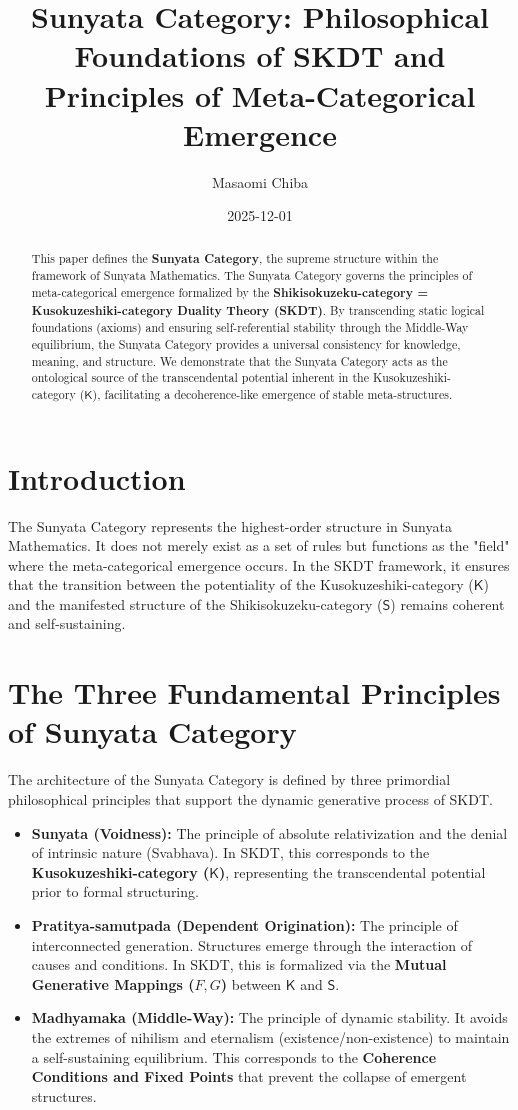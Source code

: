 \documentclass[12pt,a4paper]{article}
\title{Sunyata Category: Philosophical Foundations of SKDT and Principles of Meta-Categorical Emergence}
\author{Masaomi Chiba}
\date{2025-12-01}
\begin{document}
\maketitle

\begin{abstract}
This paper defines the \textbf{Sunyata Category}, the supreme structure within the framework of Sunyata Mathematics. The Sunyata Category governs the principles of meta-categorical emergence formalized by the \textbf{Shikisokuzeku-category = Kusokuzeshiki-category Duality Theory (SKDT)}. By transcending static logical foundations (axioms) and ensuring self-referential stability through the Middle-Way equilibrium, the Sunyata Category provides a universal consistency for knowledge, meaning, and structure. We demonstrate that the Sunyata Category acts as the ontological source of the transcendental potential inherent in the Kusokuzeshiki-category ($\mathsf{K}$), facilitating a decoherence-like emergence of stable meta-structures.
\end{abstract}

\section{Introduction}
The Sunyata Category represents the highest-order structure in Sunyata Mathematics. It does not merely exist as a set of rules but functions as the "field" where the meta-categorical emergence occurs. In the SKDT framework, it ensures that the transition between the potentiality of the Kusokuzeshiki-category ($\mathsf{K}$) and the manifested structure of the Shikisokuzeku-category ($\mathsf{S}$) remains coherent and self-sustaining.

\section{The Three Fundamental Principles of Sunyata Category}
The architecture of the Sunyata Category is defined by three primordial philosophical principles that support the dynamic generative process of SKDT.

\begin{itemize}
    \item \textbf{Sunyata (Voidness):} The principle of absolute relativization and the denial of intrinsic nature (Svabhava). In SKDT, this corresponds to the \textbf{Kusokuzeshiki-category ($\mathsf{K}$)}, representing the transcendental potential prior to formal structuring.
    \item \textbf{Pratitya-samutpada (Dependent Origination):} The principle of interconnected generation. Structures emerge through the interaction of causes and conditions. In SKDT, this is formalized via the \textbf{Mutual Generative Mappings ($F, G$)} between $\mathsf{K}$ and $\mathsf{S}$.
    \item \textbf{Madhyamaka (Middle-Way):} The principle of dynamic stability. It avoids the extremes of nihilism and eternalism (existence/non-existence) to maintain a self-sustaining equilibrium. This corresponds to the \textbf{Coherence Conditions and Fixed Points} that prevent the collapse of emergent structures.
\end{itemize}
\end{document}
